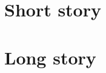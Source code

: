 \documentclass[a4paper]{article}
\begin{document}
$$

$$
\section{Short story}

\section{Long story}

\end{document}
